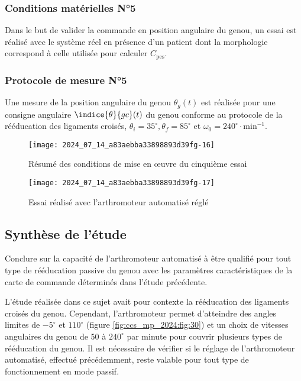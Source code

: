 \subsubsection*{Conditions matérielles N°5}

Dans le but de valider la commande en position angulaire du genou, un essai est réalisé avec le système réel en présence d'un patient dont la morphologie correspond à celle utilisée pour calculer $C_{\mathrm{pes}}$.

\subsubsection*{Protocole de mesure N°5}
Une mesure de la position angulaire du genou $\theta_{g}(t)$ est réalisée pour une consigne angulaire $\indice{\theta}{g c}(t)$ du genou conforme au protocole de la rééducation des ligaments croisés, $\theta_{i}=35^{\circ}, \theta_{f}=85^{\circ}$ et $\omega_{0}=240^{\circ} \cdot \mathrm{min}^{-1}$.

\begin{figure}[!h]\centering
\texttt{[image: 2024\_07\_14\_a83aebba33898893d39fg-16]}
\caption{\label{fig:ccs_mp_2024:fig:28}Résumé des conditions de mise en œuvre du cinquième essai}
\end{figure}


\begin{figure}[!h]\centering
\texttt{[image: 2024\_07\_14\_a83aebba33898893d39fg-17]}
\caption{\label{fig:ccs_mp_2024:fig:29}Essai réalisé avec l'arthromoteur automatisé réglé}
\end{figure}
\subsection{Synthèse de l'étude}

\begin{obj}
Conclure sur la capacité de l'arthromoteur automatisé à être qualifié pour tout type de rééducation passive du genou avec les paramètres caractéristiques de la carte de commande déterminés dans l'étude précédente.
\end{obj}

L'étude réalisée dans ce sujet avait pour contexte la rééducation des ligaments croisés du genou. Cependant, l'arthromoteur permet d'atteindre des angles limites de $-5^{\circ}$ et $110^{\circ}$ (figure \ref{fig:ccs_mp_2024:fig:30}) et un choix de vitesses angulaires du genou de 50 à $240^{\circ}$ par minute pour couvrir plusieurs types de rééducation du genou. Il est nécessaire de vérifier si le réglage de l'arthromoteur automatisé, effectué précédemment, reste valable pour tout type de fonctionnement en mode passif.

